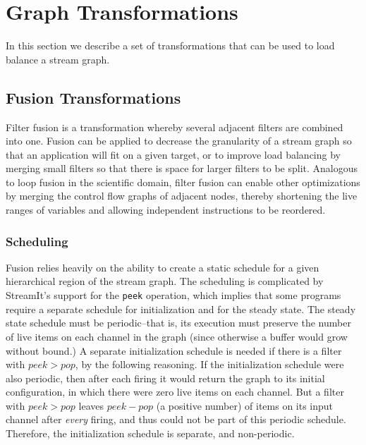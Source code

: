 \section{Graph Transformations}

In this section we describe a set of transformations that can be used
to load balance a stream graph.

\subsection{Fusion Transformations}

Filter fusion is a transformation whereby several adjacent filters are
combined into one.  Fusion can be applied to decrease the granularity
of a stream graph so that an application will fit on a given target,
or to improve load balancing by merging small filters so that there is
space for larger filters to be split.  Analogous to loop fusion in the
scientific domain, filter fusion can enable other optimizations by
merging the control flow graphs of adjacent nodes, thereby shortening
the live ranges of variables and allowing independent instructions to
be reordered.

\subsubsection{Scheduling}

Fusion relies heavily on the ability to create a static schedule for a
given hierarchical region of the stream graph.  The scheduling is
complicated by StreamIt's support for the {\tt peek} operation, which
implies that some programs require a separate schedule for
initialization and for the steady state.  The steady state schedule
must be periodic--that is, its execution must preserve the number of
live items on each channel in the graph (since otherwise a buffer
would grow without bound.)  A separate initialization schedule is
needed if there is a filter with $peek > pop$, by the following
reasoning.  If the initialization schedule were also periodic, then
after each firing it would return the graph to its initial
configuration, in which there were zero live items on each channel.
But a filter with $peek > pop$ leaves $peek-pop$ (a positive number)
of items on its input channel after {\it every} firing, and thus could
not be part of this periodic schedule.  Therefore, the initialization
schedule is separate, and non-periodic.

